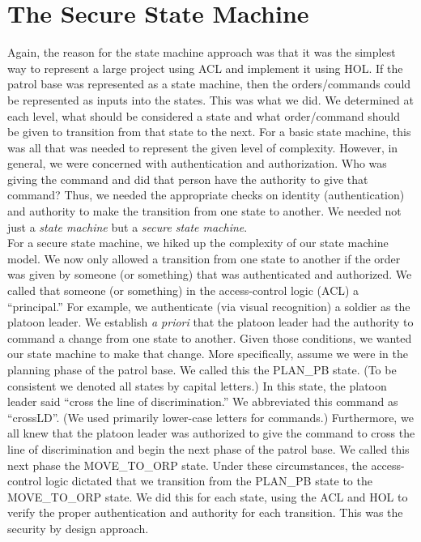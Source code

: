 
\section{The Secure State Machine}
\label{sec:secure-state-machine}

Again, the reason for the state machine approach was that it was the simplest
way to represent a large project using ACL and implement it using HOL. If the
patrol base was represented as a state machine, then the orders/commands could
be represented as inputs into the states. This was what we did. We determined
at each level, what should be considered a state and what order/command should
be given to transition from that state to the next. For a basic state machine,
this was all that was needed to represent the given level of complexity.
However, in general, we were concerned with authentication and authorization.
Who was giving the command and did that person have the authority to give that
command? Thus, we needed the appropriate checks on identity (authentication)
and authority to make the transition from one state to another. We needed not
just a \textit{state machine} but a \textit{secure state machine}.\\

For a secure state machine, we hiked up the complexity of our state machine model.
We now only allowed a transition from one state to another if the order was given by
someone (or something) that was authenticated and authorized. We called that someone
(or something) in the access-control logic (ACL) a “principal.” For example, we
authenticate (via visual recognition) a soldier as the platoon leader. We establish
\textit{a priori} that the platoon leader had the authority to command a change from one
state to another. Given those conditions, we wanted our state machine to make that
change. More specifically, assume we were in the planning phase of the patrol base.
We called this the PLAN_PB state. (To be consistent we denoted all states by capital
letters.) In this state, the platoon leader said “cross the line of discrimination.”
We abbreviated this command as “crossLD”. (We used primarily lower-case letters for
commands.) Furthermore, we all knew that the platoon leader was authorized to give the
command to cross the line of discrimination and begin the next phase of the patrol base.
We called this next phase the MOVE_TO_ORP state. Under these circumstances, the access-
control logic dictated that we transition from the PLAN_PB state to the MOVE_TO_ORP state.
We did this for each state, using the ACL and HOL to verify the proper authentication and
authority for each transition. This was the security by design approach.

